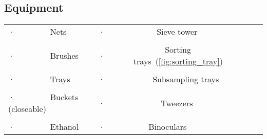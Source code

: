\begin{figure}[!htb]                               %
\centering                                                                  %
\captionbox{Sorting tray used for taxa identification.\label{fig:sorting_tray}}{   %
  \texttt{[image: images/sorting\_tray\_color]}}         %
  \hfill                                                                                    %
\captionbox{Identifying taxa within the samples using binoculars.\label{fig:sorting}}{     %
  \texttt{[image: images/sorting\_color]}}        %
  \hspace*{\fill}                                                                    %
\end{figure}




\subsection{Equipment}\label{sec:equipment}                 %


\begin{table}[htbp]
  \centering
    \begin{tabular}{l b{3cm} l}
    ·         Nets & ·   &      Sieve tower \\
                &   &\\
    ·         Brushes & · &        Sorting trays~(\cref{fig:sorting_tray}) \\
                &   &\\
    ·         Trays & ·    &     Subsampling trays \\
                &   &\\
    ·         Buckets (closeable) & ·  &       Tweezers \\
                &   &\\
    ·         Ethanol & ·     &    Binoculars \\
    \end{tabular}%
  \label{tab:addlabel}%
\end{table}%


